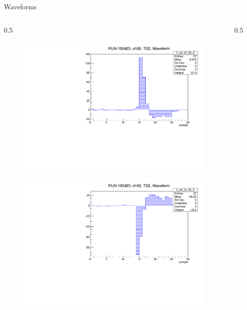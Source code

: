 \documentclass{beamer}[10pt]
\begin{document}
\begin{frame}{Waveforms}
\vspace{-4mm}
\begin{columns}
\begin{column}{0.5\framewidth}
\begin{figure}[H]
   \centering
   \includegraphics[width= .90\columnwidth]{figures/pdf/waveform_50_link_2.pdf}
   \label{fig:wfgkghl}
 \end{figure}
\vspace{-2mm}
\begin{figure}[H]
   \centering
   \includegraphics[width= .90\columnwidth]{figures/pdf/waveform_50_link_2_neg.pdf}
   \label{fig:wfgkgnvjkhl}
 \end{figure}
\end{column}
\begin{column}{0.5\framewidth}
\begin{figure}[H]
   \centering

\end{figure}
\end{column}
\end{columns}
\end{frame}
\end{document}
